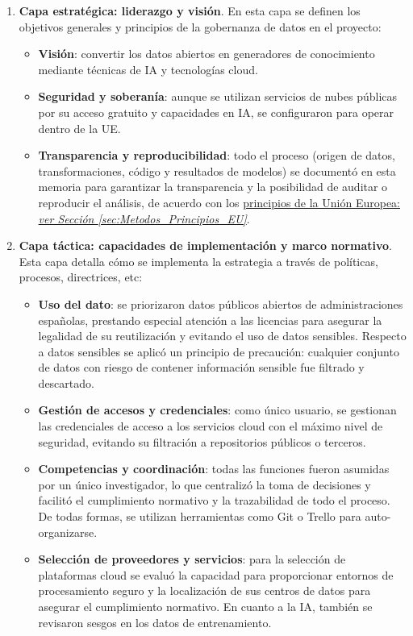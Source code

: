 \begin{enumerate}
	\item \textbf{Capa estratégica: liderazgo y visión}. En esta capa se definen los objetivos generales y principios de la gobernanza de datos en el proyecto:
	\begin{itemize}
		\item \textbf{Visión}: convertir los datos abiertos en generadores de conocimiento mediante técnicas de IA y tecnologías cloud.
		\item \textbf{Seguridad y soberanía}: aunque se utilizan servicios de nubes públicas por su acceso gratuito y capacidades en IA, se configuraron para operar dentro de la UE.
		\item \textbf{Transparencia y reproducibilidad}: todo el proceso (origen de datos, transformaciones, código y resultados de modelos) se documentó en esta memoria para garantizar la transparencia y la posibilidad de auditar o reproducir el análisis, de acuerdo con los \hyperref[sec:Metodos_Principios_EU]{principios de la Unión Europea: \textit{ver Sección \ref*{sec:Metodos_Principios_EU}}}.
	\end{itemize}
	
	\item \textbf{Capa táctica: capacidades de implementación y marco normativo}. Esta capa detalla cómo se implementa la estrategia a través de políticas, procesos, directrices, etc:
	\begin{itemize}
		\item \textbf{Uso del dato}: se priorizaron datos públicos abiertos de administraciones españolas, prestando especial atención a las licencias para asegurar la legalidad de su reutilización y evitando el uso de datos sensibles. Respecto a datos sensibles se aplicó un principio de precaución: cualquier conjunto de datos con riesgo de contener información sensible fue filtrado y descartado.
		\item \textbf{Gestión de accesos y credenciales}: como único usuario, se gestionan las credenciales de acceso a los servicios cloud con el máximo nivel de seguridad, evitando su filtración a repositorios públicos o terceros.
		\item \textbf{Competencias y coordinación}: todas las funciones fueron asumidas por un único investigador, lo que centralizó la toma de decisiones y facilitó el cumplimiento normativo y la trazabilidad de todo el proceso. De todas formas, se utilizan herramientas como Git o Trello para auto-organizarse.
		\item \textbf{Selección de proveedores y servicios}: para la selección de plataformas cloud se evaluó la capacidad para proporcionar entornos de procesamiento seguro y la localización de sus centros de datos para asegurar el cumplimiento normativo. En cuanto a la IA, también se revisaron sesgos en los datos de entrenamiento.
	\end{itemize}
	

\end{enumerate}
